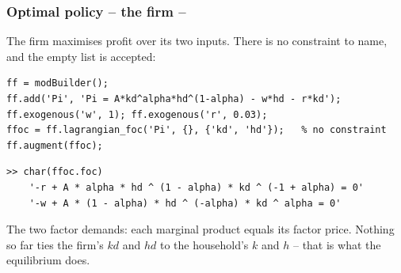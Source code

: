 \documentclass[10pt,slidestop]{beamer}
\theoremstyle{plain}
\begin{document}
\begin{frame}[c,fragile]
  \frametitle{Optimal policy -- the firm --}

  The firm maximises profit over its two inputs. There is no constraint to name, and the
  empty list is accepted:

  \begin{lstlisting}[style=MatlabConsole,basicstyle=\ttfamily\scriptsize]
ff = modBuilder();
ff.add('Pi', 'Pi = A*kd^alpha*hd^(1-alpha) - w*hd - r*kd');
ff.exogenous('w', 1); ff.exogenous('r', 0.03);
ffoc = ff.lagrangian_foc('Pi', {}, {'kd', 'hd'});   % no constraint
ff.augment(ffoc);
  \end{lstlisting}

  \begin{lstlisting}[style=MatlabConsole,basicstyle=\ttfamily\scriptsize]
>> char(ffoc.foc)
    '-r + A * alpha * hd ^ (1 - alpha) * kd ^ (-1 + alpha) = 0'
    '-w + A * (1 - alpha) * hd ^ (-alpha) * kd ^ alpha = 0'
  \end{lstlisting}

  \small The two factor demands: each marginal product equals its factor price. Nothing so
  far ties the firm's $kd$ and $hd$ to the household's $k$ and $h$ -- that is what the
  equilibrium does.

\end{frame}
\end{document}
